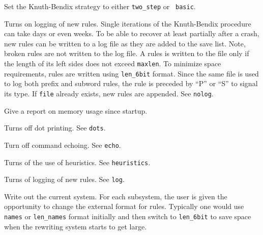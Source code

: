 \medskip
{}

\nobreak

Set the Knuth-Bendix strategy to either {\tt two\_step} or {\tt
basic}.

\medskip
{}

\nobreak

Turns on logging of new rules.  Single iterations of the Knuth-Bendix
procedure can take days or even weeks.  To be able to recover at least
partially after a crash, new rules can be written to a log file as
they are added to the save list.  Note, broken rules are not written
to the log file.  A rules is written to the file only if the length of
its left sides does not exceed {\tt maxlen}.  To minimize space
requirements, rules are written using {\tt len\_6bit} format.  Since
the same file is used to log both prefix and subword rules, the rule
is preceded by ``P'' or ``S'' to signal its type.  If {\tt file}
already exists, new rules are appended.  See {\tt nolog}.

\medskip
{}

\nobreak

Give a report on memory usage since startup.

\medskip
{}

\nobreak

Turns off dot printing.  See {\tt dots}.

\medskip
{}

\nobreak

Turn off command echoing.  See {\tt echo}.

\medskip
{}

\nobreak

Turns of the use of heuristics.  See {\tt heuristics}.

\medskip
{}

\nobreak

Turns of logging of new rules.  See {\tt log}.

\medskip
{}

\nobreak

Write out the current system.  For each subsystem, the user is given
the opportunity to change the external format for rules.  Typically
one would use {\tt names} or {\tt len\_names} format initially and
then switch to {\tt len\_6bit} to save space when the rewriting system
starts to get large.

